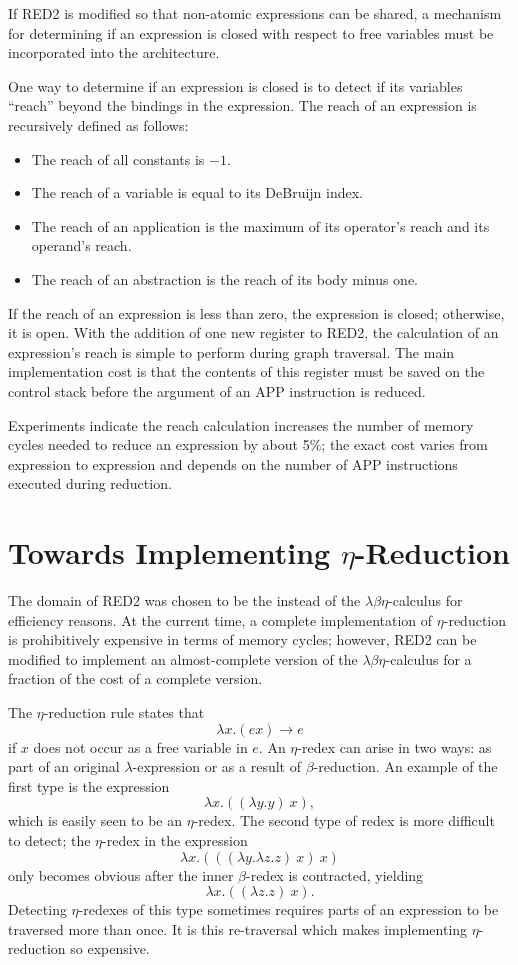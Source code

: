 If RED2 is modified so that non-atomic expressions can be shared, a mechanism
for determining if an expression is closed with respect to free variables must
be incorporated into the architecture.

One way to determine if an expression is closed is to detect if its variables
``reach'' beyond the bindings in the expression. The reach of an expression is
recursively defined as follows:

\begin{itemize}
\item The reach of all constants is \(-1\).
\item The reach of a variable is equal to its DeBruijn index.
\item The reach of an application is the maximum of its operator's reach and its
operand's reach.
\item The reach of an abstraction is the reach of its body minus one.
\end{itemize}

If the reach of an expression is less than zero, the expression is closed;
otherwise, it is open. With the addition of one new register to RED2, the
calculation of an expression's reach is simple to perform during graph
traversal. The main implementation cost is that the contents of this register
must be saved on the control stack before the argument of an APP instruction is
reduced.

Experiments indicate the reach calculation increases the number of memory cycles
needed to reduce an expression by about 5\%; the exact cost varies from
expression to expression and depends on the number of APP instructions executed
during reduction.

\section{Towards Implementing \(\eta\)-Reduction}

The domain of RED2 was chosen to be the \lambdabetacalculus{} instead of the
\(\lambda\beta\eta\)-calculus for efficiency reasons. At the current time, a
complete implementation of \(\eta\)-reduction is prohibitively expensive in terms
of memory cycles; however, RED2 can be modified to implement an almost-complete
version of the \(\lambda\beta\eta\)-calculus for a fraction of the cost of a
complete version.

The \(\eta\)-reduction rule states that
\[
\lambda x.(e x)\longrightarrow e
\]
if \(x\) does not occur as a free variable in \(e\). An \(\eta\)-redex can arise
in two ways: as part of an original \(\lambda\)-expression or as a result of
\(\beta\)-reduction. An example of the first type is the expression
\[
\lambda x.((\lambda y.y)\ x),
\]
which is easily seen to be an \(\eta\)-redex. The second type of redex is more
difficult to detect; the \(\eta\)-redex in the expression
\[
\lambda x.(((\lambda y.\lambda z.z)\ x)\ x)
\]
only becomes obvious after the inner \(\beta\)-redex is contracted, yielding
\[
\lambda x.((\lambda z.z)\ x).
\]
Detecting \(\eta\)-redexes of this type sometimes requires parts of an
expression to be traversed more than once. It is this re-traversal which makes
implementing \(\eta\)-reduction so expensive.

